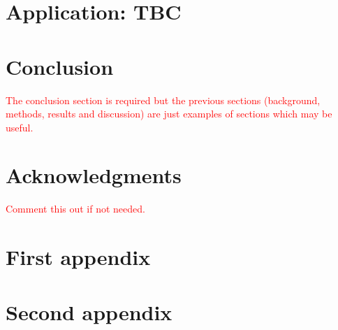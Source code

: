 \documentclass[a4paper,11pt, titlepage]{article}
\theoremstyle{definition}
\theoremstyle{plain}
\theoremstyle{remark}
\begin{document}
\section{Application: TBC}

\section{Conclusion}
\textcolor{red}{The conclusion section is required but the previous sections (background, methods, results and discussion) are just examples of sections which may be useful.}

\section*{Acknowledgments}
\textcolor{red}{Comment this out if not needed.}

\appendix

\section{First appendix}
\label{sec:appendix1}

\section{Second appendix}
\label{sec:appendix2}


\end{document}
